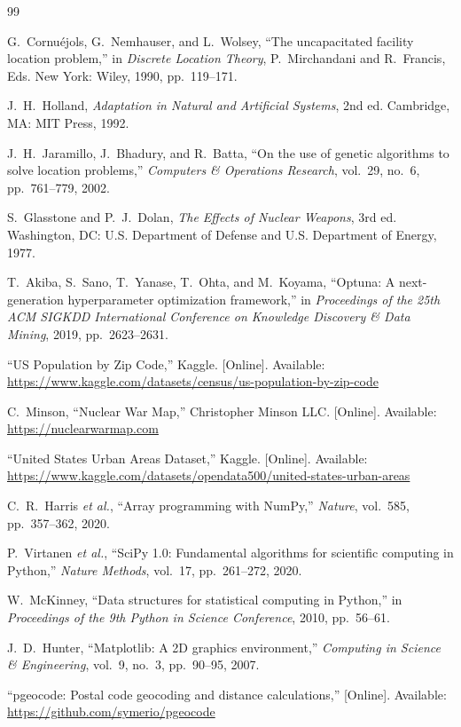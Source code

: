 \documentclass[12pt]{article}
\begin{document}
\begin{thebibliography}{99}

G.~Cornu\'{e}jols, G.~Nemhauser, and L.~Wolsey,
``The uncapacitated facility location problem,''
in \textit{Discrete Location Theory}, P.~Mirchandani and R.~Francis, Eds.
New York: Wiley, 1990, pp.~119--171.

J.~H.~Holland,
\textit{Adaptation in Natural and Artificial Systems},
2nd ed. Cambridge, MA: MIT Press, 1992.

J.~H.~Jaramillo, J.~Bhadury, and R.~Batta,
``On the use of genetic algorithms to solve location problems,''
\textit{Computers \& Operations Research}, vol.~29, no.~6, pp.~761--779, 2002.

S.~Glasstone and P.~J.~Dolan,
\textit{The Effects of Nuclear Weapons}, 3rd ed.
Washington, DC: U.S. Department of Defense and U.S. Department of Energy, 1977.

T.~Akiba, S.~Sano, T.~Yanase, T.~Ohta, and M.~Koyama,
``Optuna: A next-generation hyperparameter optimization framework,''
in \textit{Proceedings of the 25th ACM SIGKDD International Conference on Knowledge Discovery \& Data Mining}, 2019, pp.~2623--2631.

``US Population by Zip Code,''
Kaggle. [Online]. Available: \url{https://www.kaggle.com/datasets/census/us-population-by-zip-code}

C.~Minson,
``Nuclear War Map,'' Christopher Minson LLC. [Online]. Available: \url{https://nuclearwarmap.com}

``United States Urban Areas Dataset,''
Kaggle. [Online]. Available: \url{https://www.kaggle.com/datasets/opendata500/united-states-urban-areas}

C.~R.~Harris \textit{et al.},
``Array programming with NumPy,''
\textit{Nature}, vol.~585, pp.~357--362, 2020.

P.~Virtanen \textit{et al.},
``SciPy 1.0: Fundamental algorithms for scientific computing in Python,''
\textit{Nature Methods}, vol.~17, pp.~261--272, 2020.

W.~McKinney,
``Data structures for statistical computing in Python,''
in \textit{Proceedings of the 9th Python in Science Conference}, 2010, pp.~56--61.

J.~D.~Hunter,
``Matplotlib: A 2D graphics environment,''
\textit{Computing in Science \& Engineering}, vol.~9, no.~3, pp.~90--95, 2007.

``pgeocode: Postal code geocoding and distance calculations,''
[Online]. Available: \url{https://github.com/symerio/pgeocode}

\end{thebibliography}
\end{document}

